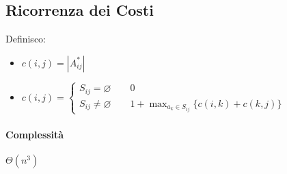 \subsection{Ricorrenza dei Costi}
Definisco:
\begin{itemize}
    \item $c(i,j) = |A_{ij}^*|$
    \item $c(i,j) = \begin{cases}
        S_{ij} = \varnothing \qquad 0 \\
        S_{ij} \not= \varnothing \qquad 1 + \max_{a_k \in S_{ij}} \{c(i,k) + c(k,j)\}
    \end{cases}$
\end{itemize}
\paragraph{Complessità} $\Theta(n^3)$
